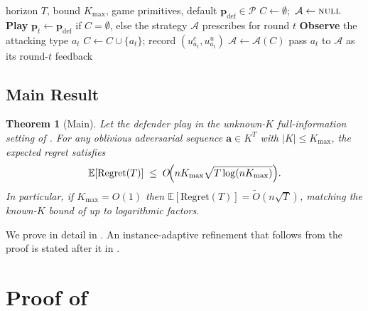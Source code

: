 \documentclass[letterpaper,9pt,twocolumn]{extarticle}
\newcommand{\pvec}{\mathbf{p}}
\newcommand{\avec}{\mathbf{a}}
\newcommand{\cP}{\mathcal{P}}
\newcommand{\EE}{\mathbb{E}}
\newcommand{\Kmax}{K_{\max}}
\newcommand{\Regret}{\mathrm{Regret}}
\theoremstyle{plain}
\newtheorem{theorem}{Theorem}
\theoremstyle{definition}
\theoremstyle{remark}
\begin{document}
\begin{algorithm}[t]
\caption{\textsc{Grow-Catalogue} (full information).}
\label{alg:gc}
\begin{algorithmic}[1]
\small
\Require horizon $T$, bound $\Kmax$, game primitives, default $\pvec_{\text{def}}\in\cP$
\State $C\gets\emptyset$;~$\mathcal{A}\gets\textsc{null}$
  \State \textbf{Play} $\pvec_t\gets\pvec_{\text{def}}$ if $C=\emptyset$, else the strategy $\mathcal{A}$ prescribes for round $t$
  \State \textbf{Observe} the attacking type $a_t$
   
    \State $C\gets C\cup\{a_t\}$; record $(u_{a_t}^c,u_{a_t}^u)$
    \State $\mathcal{A}\gets\mathcal{A}(C)$
  \Else {}
    \State pass $a_t$ to $\mathcal{A}$ as its round-$t$ feedback
  \EndIf
\EndFor
\end{algorithmic}
\end{algorithm}


\subsection{Main Result}
\label{sec:mainresult}

\begin{theorem}[Main]
\label{thm:main}
Let the defender play  in the unknown-$K$ full-information
setting of . For any oblivious adversarial sequence
$\avec\in K^T$ with $|K|\le\Kmax$, the expected regret satisfies
\begin{equation}
\EE[\Regret(T)]\;\le\;O\!\Bigl(n\Kmax\sqrt{T\log (n\Kmax)}\Bigr).
\label{eq:main}
\end{equation}
In particular, if $\Kmax=O(1)$ then $\EE[\Regret(T)]=\tilde O(n\sqrt T)$,
matching the known-$K$ bound of \citet[Theorem 5.1]{balcan2015} up to
logarithmic factors.
\end{theorem}

We prove  in detail in . An
instance-adaptive refinement that follows from the proof is stated after it
in .

\section{Proof of }
\label{sec:proof}
\end{document}
